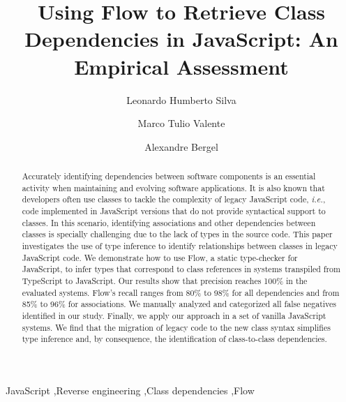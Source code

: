 \documentclass[review]{elsarticle}
\begin{document}
\begin{frontmatter}

\title{Using Flow to Retrieve Class Dependencies in JavaScript: An Empirical Assessment}



\author[mymainaddress]{Leonardo Humberto Silva}

\author[mtovaddress]{Marco Tulio Valente}

\author[bergeladdress]{Alexandre Bergel}

\address[mymainaddress]{Federal Institute of Northern Minas Gerais}
\address[mtovaddress]{Federal University of Minas Gerais}
\address[bergeladdress]{University of Chile}

\begin{abstract}
Accurately identifying dependencies between software components is an essential activity when maintaining and evolving software applications. It is also known that developers often use classes to tackle the complexity of legacy JavaScript code, \emph{i.e.}, code implemented in JavaScript versions that do not provide syntactical support to classes. In this scenario, identifying associations and other dependencies between classes is specially challenging due to the lack of types in the source code. This paper investigates the use of type inference to identify relationships between classes in legacy JavaScript code. We demonstrate how to use Flow, a static type-checker for JavaScript, to infer types that correspond to class references in systems transpiled from TypeScript to JavaScript. Our results show that precision reaches 100\% in the evaluated systems. Flow's recall ranges from 80\% to 98\% for all dependencies and from 85\% to 96\% for associations. We manually analyzed and categorized all false negatives identified in our study. Finally, we apply our approach in a set of vanilla JavaScript systems. We find that the migration of legacy code to the new class syntax simplifies type inference and, by consequence, the identification of class-to-class dependencies. 
\end{abstract}

\begin{keyword}
JavaScript \sep Reverse engineering \sep Class dependencies \sep Flow
\end{keyword}

\end{frontmatter}
\end{document}
